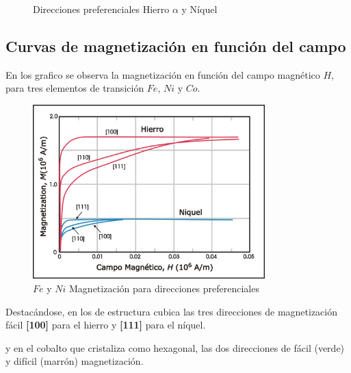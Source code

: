\begin{figure}[H]
\begin{minipage}[b]{0.47\textwidth}
  \end{minipage}
  \caption{Direcciones preferenciales Hierro $\alpha$ y Níquel}
\end{figure}

\subsection{Curvas de magnetización en función del campo}

En los grafico se observa la magnetización en función del campo magnético $H$, para tres elementos de transición $Fe$, $Ni$ y $Co$.

\begin{figure}[H]
    \centering
    \includegraphics[width=0.8\textwidth]{./Figures/MagneticAnisotropy2}
	\caption{$Fe$ y $Ni$ Magnetización para direcciones preferenciales}
	\label{fig:MagneticAnisotropy2}
\end{figure}

Destacándose, en los de estructura cubica las tres direcciones de magnetización fácil \textbf{[100]} para el hierro y \textbf{[111]} para el níquel.

y en el cobalto que cristaliza como hexagonal, las dos direcciones de fácil (verde) y difícil  (marrón) magnetización.

